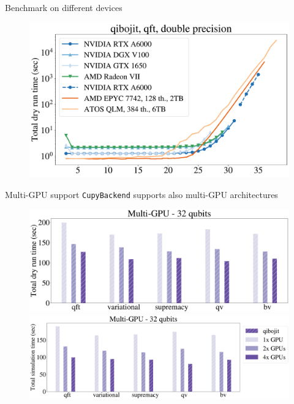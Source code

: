 \documentclass[11p,aspectratio=169]{beamer}
\begin{document}
\begin{frame}{Benchmark on different devices}

            \begin{figure}
                \includegraphics[width = 0.8 \textwidth]{figures/devices_qft_total_simulation_time_double.pdf}
            \end{figure}
    
\end{frame}

\begin{frame}{Multi-GPU support}
    \texttt{CupyBackend} supports also multi-GPU architectures

    \begin{figure}
        \includegraphics[height= 0.4 \textheight]{figures/multigpu_32qubits_total_dry_time_double.pdf}
        \includegraphics[height= 0.315 \textheight]{figures/multigpu_32qubits_total_simulation_time_double.pdf}
    \end{figure}
\end{frame}
\end{document}
